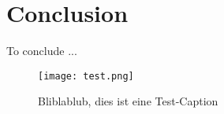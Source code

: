 \section{Conclusion}
\label{sec:Conclusion}

To conclude  ... \cite{CitekeyArticle}
\\

\begin{figure}[h]
\centering
\texttt{[image: test.png]}
\caption{Bliblablub, dies ist eine Test-Caption}
\end{figure}
